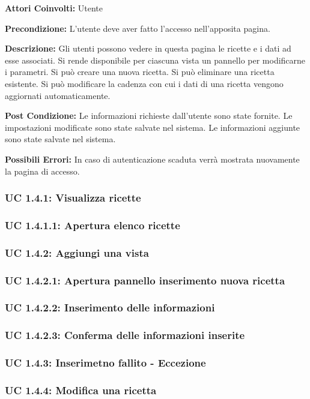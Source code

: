 \textbf{Attori Coinvolti:}
Utente

\textbf{Precondizione:}
L’utente deve aver fatto l’accesso nell’apposita pagina.

\textbf{Descrizione:}
Gli utenti possono vedere in questa pagina le ricette e i dati ad esse associati. 
Si rende disponibile per ciascuna vista un pannello per modificarne i parametri. 
Si può creare una nuova ricetta. 
Si può eliminare una ricetta esistente.
Si può modificare la cadenza con cui i dati di una ricetta vengono aggiornati automaticamente.

\textbf{Post Condizione:}
Le informazioni richieste dall'utente sono state fornite.
Le impostazioni modificate sono state salvate nel sistema.
Le informazioni aggiunte sono state salvate nel sistema.

\textbf{Possibili Errori:}
In caso di autenticazione scaduta verrà mostrata nuovamente la pagina di accesso.

\subsubsection{UC 1.4.1: Visualizza ricette}
\subsubsection{UC 1.4.1.1: Apertura elenco ricette}
\subsubsection{UC 1.4.2: Aggiungi una vista}
\subsubsection{UC 1.4.2.1: Apertura pannello inserimento nuova ricetta}
\subsubsection{UC 1.4.2.2: Inserimento delle informazioni }
\subsubsection{UC 1.4.2.3: Conferma delle informazioni inserite}
\subsubsection{UC 1.4.3: Inserimetno fallito - Eccezione}
\subsubsection{UC 1.4.4: Modifica una ricetta}
